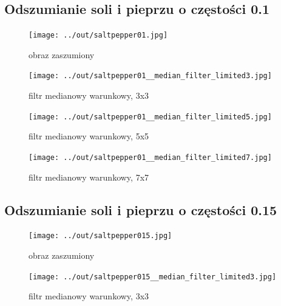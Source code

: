 \documentclass[a4paper,12pt]{article}
\begin{document}
\newpage
\subsection{Odszumianie soli i pieprzu o częstości 0.1}
\begin{figure}[h!]
\begin{minipage}[t]{7.5cm}
\begin{center}
\texttt{[image: ../out/saltpepper01.jpg]}
\caption{obraz zaszumiony}
\end{center}
\end{minipage}
\hfill
\begin{minipage}[t]{7.5cm}
\begin{center}
\texttt{[image: ../out/saltpepper01\_\_median\_filter\_limited3.jpg]}
\caption{filtr medianowy warunkowy, 3x3}
\end{center}
\end{minipage}
\end{figure}

\begin{figure}[h!]
\begin{minipage}[t]{7.5cm}
\begin{center}
\texttt{[image: ../out/saltpepper01\_\_median\_filter\_limited5.jpg]}
\caption{filtr medianowy warunkowy, 5x5}
\end{center}
\end{minipage}
\hfill
\begin{minipage}[t]{7.5cm}
\begin{center}
\texttt{[image: ../out/saltpepper01\_\_median\_filter\_limited7.jpg]}
\caption{filtr medianowy warunkowy, 7x7}
\end{center}
\end{minipage}
\end{figure}


\newpage
\subsection{Odszumianie soli i pieprzu o częstości 0.15}
\begin{figure}[h!]
\begin{minipage}[t]{7.5cm}
\begin{center}
\texttt{[image: ../out/saltpepper015.jpg]}
\caption{obraz zaszumiony}
\end{center}
\end{minipage}
\hfill
\begin{minipage}[t]{7.5cm}
\begin{center}
\texttt{[image: ../out/saltpepper015\_\_median\_filter\_limited3.jpg]}
\caption{filtr medianowy warunkowy, 3x3}
\end{center}
\end{minipage}
\end{figure}
\end{document}
